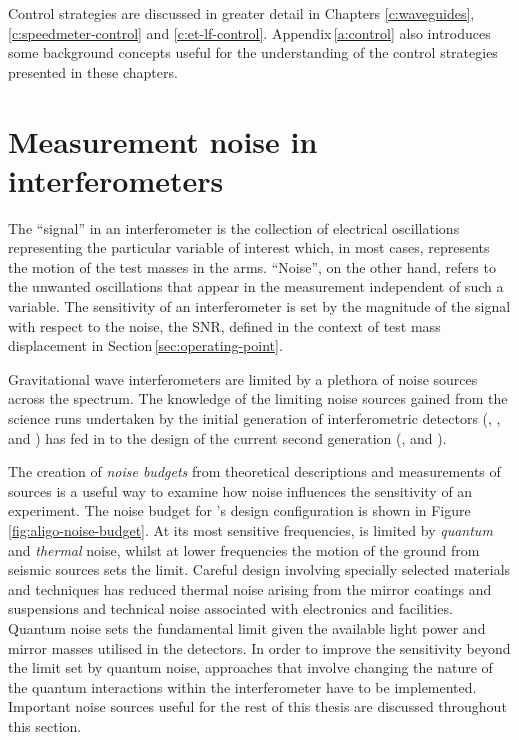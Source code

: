 Control strategies are discussed in greater detail in Chapters \ref{c:waveguides}, \ref{c:speedmeter-control} and \ref{c:et-lf-control}. Appendix\,\ref{a:control} also introduces some background concepts useful for the understanding of the control strategies presented in these chapters.

\section{\label{sec:ifo-noise}Measurement noise in interferometers}
The ``signal'' in an interferometer is the collection of electrical oscillations representing the particular variable of interest which, in most cases, represents the motion of the test masses in the arms. ``Noise'', on the other hand, refers to the unwanted oscillations that appear in the measurement independent of such a variable. The sensitivity of an interferometer is set by the magnitude of the signal with respect to the noise, the \gls{SNR}, defined in the context of test mass displacement in Section\,\ref{sec:operating-point}.

Gravitational wave interferometers are limited by a plethora of noise sources across the spectrum. The knowledge of the limiting noise sources gained from the science runs undertaken by the initial generation of interferometric detectors (\LIGO{}, \VIRGO{}, \GEO{} and \TAMA{}) has fed in to the design of the current second generation (\ALIGO{}, \AVIRGO{} and \KAGRA{}).

The creation of \emph{noise budgets} from theoretical descriptions and measurements of sources is a useful way to examine how noise influences the sensitivity of an experiment. The noise budget for \ALIGO{}'s design configuration is shown in Figure\,\ref{fig:aligo-noise-budget}. At its most sensitive frequencies, \ALIGO{} is limited by \emph{quantum} and \emph{thermal} noise, whilst at lower frequencies the motion of the ground from seismic sources sets the limit. Careful design involving specially selected materials and techniques has reduced thermal noise arising from the mirror coatings and suspensions and technical noise associated with electronics and facilities. Quantum noise sets the fundamental limit given the available light power and mirror masses utilised in the detectors. In order to improve the sensitivity beyond the limit set by quantum noise, approaches that involve changing the nature of the quantum interactions within the interferometer have to be implemented. Important noise sources useful for the rest of this thesis are discussed throughout this section.

